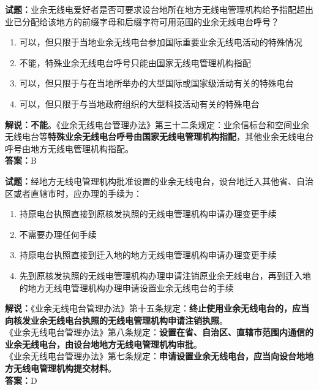 \documentclass{ctexbook}
\begin{document}
\vspace{1em}

\textbf{试题：}业余无线电爱好者是否可要求设台地所在地方无线电管理机构给予指配超出业已分配给该地方的前缀字母和后缀字符可用范围的业余无线电台呼号？
\begin{enumerate}[leftmargin=3em]
  \item 可以，但只限于当地业余无线电台参加国际重要业余无线电活动的特殊情况
  \item 不能，特殊业余无线电台呼号只能由国家无线电管理机构指配
  \item 可以，但只限于与在当地所举办的大型国际或国家级活动有关的特殊电台
  \item 可以，但只限于与当地政府组织的大型科技活动有关的特殊电台
\end{enumerate}
\textbf{解说：不能}。《业余无线电台管理办法》第三十二条规定：业余信标台和空间业余无线电台等\textbf{特殊业余无线电台呼号由国家无线电管理机构指配}，其他业余无线电台呼号由地方无线电管理机构指配。\\\noindent\textbf{答案：}B

\vspace{1em}

\textbf{试题：}经地方无线电管理机构批准设置的业余无线电台，设台地迁入其他省、自治区或者直辖市时，应办理的手续为：
\begin{enumerate}[leftmargin=3em]
  \item 持原电台执照直接到原核发执照的无线电管理机构申请办理变更手续
  \item 不需要办理任何手续
  \item 持原电台执照直接到迁入地的地方无线电管理机构申请办理变更手续
  \item 先到原核发执照的无线电管理机构办理申请注销原业余无线电台，再到迁入地的地方无线电管理机构办理申请设置业余无线电台的手续
\end{enumerate}
\noindent\textbf{解说：}《业余无线电台管理办法》第十五条规定：\textbf{终止使用业余无线电台的，应当向核发业余无线电台执照的无线电管理机构申请注销执照}。\\
《业余无线电台管理办法》第八条规定：\textbf{设置在省、自治区、直辖市范围内通信的业余无线电台，由设台地地方无线电管理机构审批}。\\
《业余无线电台管理办法》第七条规定：\textbf{申请设置业余无线电台，应当向设台地地方无线电管理机构提交材料}。\\\noindent\textbf{答案：}D

\vspace{1em}
\end{document}
